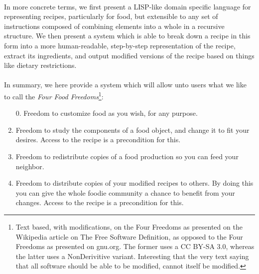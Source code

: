 \paragraph{}
In more concrete terms, we first present a LISP-like domain specific language for representing recipes, particularly for food, but extensible to any set of instructions composed of combining elements into a whole in a recursive structure. We then present a system which is able to break down a recipe in this form into a more human-readable, step-by-step representation of the recipe, extract its ingredients, and output modified versions of the recipe based on things like dietary restrictions.

\paragraph{}
In summary, we here provide a system which will allow unto users what we like to call the \textit{Four Food Freedoms}\footnote{Text based, with modifications, on the Four Freedoms as presented on the Wikipedia article on The Free Software Definition, as opposed to the Four Freedoms as presented on gnu.org. The former uses a CC BY-SA 3.0, whereas the latter uses a NonDerivitive variant. Interesting that the very text saying that all software should be able to be modified, cannot itself be modified.}:
\begin{enumerate}
    \item[0.] Freedom to customize food as you wish, for any purpose.
    \item Freedom to study the components of a food object, and change it to fit your desires. Access to the recipe is a precondition for this.
    \item Freedom to redistribute copies of a food production so you can feed your neighbor.
    \item Freedom to distribute copies of your modified recipes to others. By doing this you can give the whole foodie community a chance to benefit from your changes. Access to the recipe is a precondition for this.
\end{enumerate}



